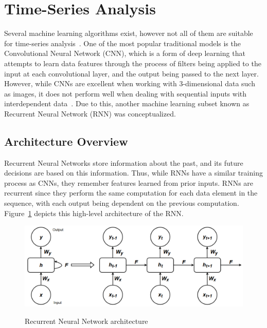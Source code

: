 \section{Time-Series Analysis}
\label{sec:ch2-time-series}

Several machine learning algorithms exist, however not all of them are suitable for time-series analysis~\cite{mahmoud2021survey}. One of the most popular traditional models is the Convolutional Neural Network (CNN), which is a form of deep learning that attempts to learn data features through the process of filters being applied to the input at each convolutional layer, and the output being passed to the next layer. However, while CNNs are excellent when working with 3-dimensional data such as images, it does not perform well when dealing with sequential inputs with interdependent data~\cite{zhao2017convolutional}. Due to this, another machine learning subset known as Recurrent Neural Network (RNN) was conceptualized. \par

\subsection{Architecture Overview}
\label{subsec:ch2-time-series-overview}

Recurrent Neural Networks store information about the past, and its future decisions are based on this information. Thus, while RNNs have a similar training process as CNNs, they remember features learned from prior inputs. RNNs are recurrent since they perform the same computation for each data element in the sequence, with each output being dependent on the previous computation. Figure~\ref{fig:rnn-architecture} depicts this high-level architecture of the RNN.\par

\begin{figure}[htb]
    \centering
    \caption{Recurrent Neural Network architecture}
    \includegraphics[width=1.0\linewidth]{Figures/RNN-Overview.pdf}
    \label{fig:rnn-architecture}
\end{figure}

